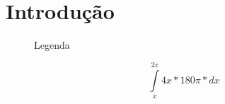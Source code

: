\section{Introdução}

\lipsum[1]
\begin{center}
\begin{figure}[h]
	\caption{Legenda}
	\label{fig:placeholder.jpg}
\end{figure}
	\begin{equation}
		\int\limits_{x}^{2x} 4x*180\pi*dx
	\end{equation}
\end{center}